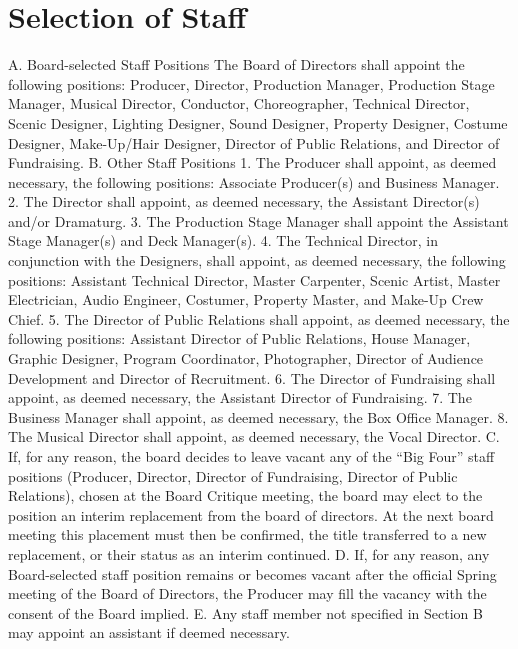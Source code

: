 \documentclass{wst}
\begin{document}
\section{Selection of Staff}
A.	Board-selected Staff Positions
The Board of Directors shall appoint the following positions: Producer, Director, Production Manager, Production Stage Manager, Musical Director, Conductor, Choreographer, Technical Director, Scenic Designer, Lighting Designer, Sound Designer, Property Designer, Costume Designer, Make-Up/Hair Designer, Director of Public Relations, and Director of Fundraising.
B.	Other Staff Positions
1.	The Producer shall appoint, as deemed necessary, the following positions: Associate Producer(s) and Business Manager.
2.	The Director shall appoint, as deemed necessary, the Assistant Director(s) and/or Dramaturg.
3.	The Production Stage Manager shall appoint the Assistant Stage Manager(s) and Deck Manager(s).
4.	The Technical Director, in conjunction with the Designers, shall appoint, as deemed necessary, the following positions: Assistant Technical Director, Master Carpenter, Scenic Artist, Master Electrician, Audio Engineer, Costumer, Property Master, and Make-Up Crew Chief.
5.	The Director of Public Relations shall appoint, as deemed necessary, the following positions: Assistant Director of Public Relations, House Manager, Graphic Designer, Program Coordinator, Photographer, Director of Audience Development and Director of Recruitment.
6.	The Director of Fundraising shall appoint, as deemed necessary, the Assistant Director of Fundraising.
7. The Business Manager shall appoint, as deemed necessary, the Box Office Manager.
8. The Musical Director shall appoint, as deemed necessary, the Vocal Director.
C.	If, for any reason, the board decides to leave vacant any of the “Big Four” staff positions (Producer, Director, Director of Fundraising, Director of Public Relations), chosen at the Board Critique meeting, the board may elect to the position an interim replacement from the board of directors.  At the next board meeting this placement must then be confirmed, the title transferred to a new replacement, or their status as an interim continued.     
D.	If, for any reason, any Board-selected staff position remains or becomes vacant after the official Spring meeting of the Board of Directors, the Producer may fill the vacancy with the consent of the Board implied.
E.	Any staff member not specified in Section B may appoint an assistant if deemed necessary.
\end{document}
